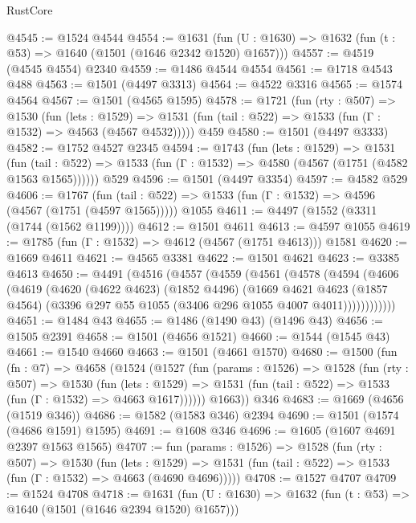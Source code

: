\begin{lexlean}{RustCore}
\begin{coremodule}
@4545 := @1524 @4544
@4554 := @1631 (fun (U : @1630) => @1632 (fun (t : @53) => @1640 (@1501 (@1646 @2342 @1520) @1657)))
@4557 := @4519 (@4545 @4554) @2340
@4559 := @1486 @4544 @4554
@4561 := @1718 @4543 @488
@4563 := @1501 (@4497 @3313)
@4564 := @4522 @3316
@4565 := @1574 @4564
@4567 := @1501 (@4565 @1595)
@4578 := @1721
    (fun (rty : @507) =>
    @1530
      (fun (lets : @1529) =>
      @1531 (fun (tail : @522) => @1533 (fun (Γ : @1532) => @4563 (@4567 @4532)))))
    @459
@4580 := @1501 (@4497 @3333)
@4582 := @1752 @4527 @2345
@4594 := @1743
    (fun (lets : @1529) =>
    @1531
      (fun (tail : @522) => @1533 (fun (Γ : @1532) => @4580 (@4567 (@1751 (@4582 @1563 @1565))))))
    @529
@4596 := @1501 (@4497 @3354)
@4597 := @4582 @529
@4606 := @1767
    (fun (tail : @522) => @1533 (fun (Γ : @1532) => @4596 (@4567 (@1751 (@4597 @1565)))))
    @1055
@4611 := @4497 (@1552 (@3311 (@1744 (@1562 @1199))))
@4612 := @1501 @4611
@4613 := @4597 @1055
@4619 := @1785 (fun (Γ : @1532) => @4612 (@4567 (@1751 @4613))) @1581
@4620 := @1669 @4611
@4621 := @4565 @3381
@4622 := @1501 @4621
@4623 := @3385 @4613
@4650 := @4491
    (@4516
      (@4557
        (@4559
          (@4561
            (@4578
              (@4594
                (@4606
                  (@4619
                    (@4620
                      (@4622 @4623)
                      (@1852 @4496)
                      (@1669
                        @4621
                        @4623
                        (@1857 @4564)
                        (@3396 @297 @55 @1055 (@3406 @296 @1055 @4007 @4011))))))))))))
@4651 := @1484 @43
@4655 := @1486 (@1490 @43) (@1496 @43)
@4656 := @1505 @2391
@4658 := @1501 (@4656 @1521)
@4660 := @1544 (@1545 @43)
@4661 := @1540 @4660
@4663 := @1501 (@4661 @1570)
@4680 := @1500
    (fun (fn : @7) =>
    @4658
      (@1524
        (@1527
          (fun (params : @1526) =>
          @1528
            (fun (rty : @507) =>
            @1530
              (fun (lets : @1529) =>
              @1531 (fun (tail : @522) => @1533 (fun (Γ : @1532) => @4663 @1617))))))
        @1663))
    @346
@4683 := @1669 (@4656 (@1519 @346))
@4686 := @1582 (@1583 @346) @2394
@4690 := @1501 (@1574 (@4686 @1591) @1595)
@4691 := @1608 @346
@4696 := @1605 (@1607 @4691 @2397 @1563 @1565)
@4707 := fun (params : @1526) =>
  @1528
    (fun (rty : @507) =>
    @1530
      (fun (lets : @1529) =>
      @1531 (fun (tail : @522) => @1533 (fun (Γ : @1532) => @4663 (@4690 @4696)))))
@4708 := @1527 @4707
@4709 := @1524 @4708
@4718 := @1631 (fun (U : @1630) => @1632 (fun (t : @53) => @1640 (@1501 (@1646 @2394 @1520) @1657)))

\end{coremodule}
\end{lexlean}
